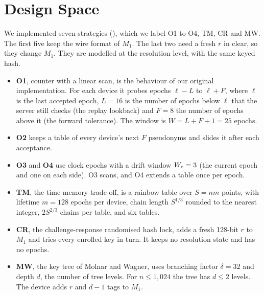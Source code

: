 \section{Design Space}\label{sec:design}
We implemented seven strategies (\designref), which we label O1 to O4, TM, CR and MW. The first five keep the wire
format of $M_1$. The last two need a fresh $r$ in clear, so they change $M_1$. They are modelled at the resolution level,
with the same keyed hash.
\begin{itemize}
\item \textbf{O1}, counter with a linear scan, is the behaviour of our original implementation. For each device it probes
epochs $\ell-L$ to $\ell+F$, where $\ell$ is the last accepted epoch, $L=16$ is the number of epochs below $\ell$ that the
server still checks (the replay lookback) and $F=8$ the number of epochs above it (the forward tolerance). The window is
$W=L+F+1=25$ epochs.
\item \textbf{O2} keeps a table of every device's next $F$ pseudonyms and slides it after each acceptance.
\item \textbf{O3} and \textbf{O4} use clock epochs with a drift window $W_{\mathrm{c}}=3$ (the current epoch and one on each side).
O3 scans, and O4 extends a table once per epoch.
\item \textbf{TM}, the time-memory trade-off, is a rainbow table over $S=nm$ points, with lifetime $m=128$ epochs per
device, chain length $S^{1/3}$ rounded to the nearest integer, $2S^{2/3}$ chains per table, and six tables.
\item \textbf{CR}, the challenge-response randomised hash lock, adds a fresh 128-bit $r$ to $M_1$ and tries every enrolled
key in turn. It keeps no resolution state and has no epochs.
\item \textbf{MW}, the key tree of Molnar and Wagner, uses branching factor $\delta=32$ and depth $d$, the number of tree
levels. For $n\le1{,}024$ the tree has $d\le2$ levels. The device adds $r$ and $d-1$ tags to $M_1$.
\end{itemize}

